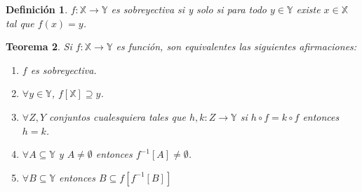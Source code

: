 \documentclass[landscape,twocolumn]{article}
\newtheorem{theorem}{Teorema}[section]
\newtheorem{definition}[theorem]{Definición}
\begin{document}
\begin{definition}
    $f: \mathbb{X} \rightarrow \mathbb{Y}$ es sobreyectiva si y solo si para todo $y \in \mathbb{Y}$ existe $x \in \mathbb{X}$ tal que $f(x) = y$.
\end{definition}

\begin{theorem}
    Si $f: \mathbb{X} \rightarrow \mathbb{Y}$ es función, son equivalentes las siguientes afirmaciones:
    \begin{enumerate}
        \item $f$ es sobreyectiva.
        \item $\forall y \in \mathbb{Y}$, $f[\mathbb{X}] \supseteq y$.
        \item $ \forall Z, Y$ conjuntos cualesquiera tales que $h, k: Z \rightarrow \mathbb{Y}$ si $h \circ f = k \circ f$ entonces $h = k$.
        \item $\forall A \subseteq \mathbb{Y}$ y $A \ne \emptyset$ entonces $f^{-1}[A] \ne \emptyset$.
        \item $\forall B \subseteq \mathbb{Y}$ entonces $B \subseteq f[f^{-1}[B]]$ 
    \end{enumerate}
\end{theorem}
\end{document}
